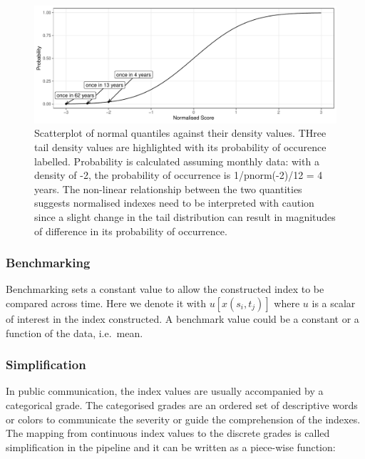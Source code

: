 \documentclass[
]{interact}
\begin{document}
\begin{figure}

{\centering \includegraphics{tidyindex_files/figure-pdf/fig-normalising-1.pdf}

}

\caption{\label{fig-normalising}Scatterplot of normal quantiles against
their density values. THree tail density values are highlighted with its
probability of occurence labelled. Probability is calculated assuming
monthly data: with a density of -2, the probability of occurrence is
1/pnorm(-2)/12 = 4 years. The non-linear relationship between the two
quantities suggests normalised indexes need to be interpreted with
caution since a slight change in the tail distribution can result in
magnitudes of difference in its probability of occurrence.}

\end{figure}

\hypertarget{benchmarking}{%
\subsubsection{Benchmarking}\label{benchmarking}}

Benchmarking sets a constant value to allow the constructed index to be
compared across time. Here we denote it with \(u[x(s_i, t_j)]\) where
\(u\) is a scalar of interest in the index constructed. A benchmark
value could be a constant or a function of the data, i.e.~mean.

\hypertarget{simplification}{%
\subsubsection{Simplification}\label{simplification}}

In public communication, the index values are usually accompanied by a
categorical grade. The categorised grades are an ordered set of
descriptive words or colors to communicate the severity or guide the
comprehension of the indexes. The mapping from continuous index values
to the discrete grades is called simplification in the pipeline and it
can be written as a piece-wise function:
\end{document}
